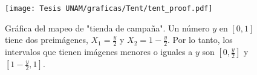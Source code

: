 \documentclass[../Main.tex]{subfiles}
\begin{document}
\begin{figure}[h]
    \centering
    \texttt{[image: Tesis UNAM/graficas/Tent/tent\_proof.pdf]}
    \caption{Gráfica del mapeo de "tienda de campaña". Un número $y$ en $[0,1]$ tiene dos preimágenes, $X_1=\frac{y}{2}$ y $X_2=1-\frac{y}{2}$. Por lo tanto, los intervalos que tienen imágenes menores o iguales a $y$ son $[0,\frac{y}{2}]$ y $[1-\frac{y}{2},1]$.}
    \label{fig:tent_proof}
\end{figure} 
  
\end{document}
